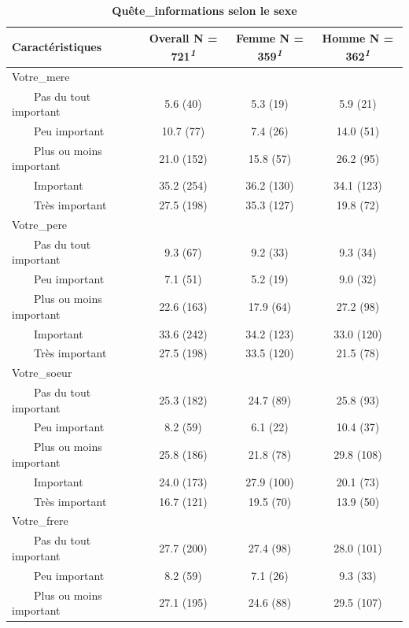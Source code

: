 \documentclass[
]{article}
\begin{document}
\newpage
\begin{table}[!t]
\caption{\label{tab:unnamed-chunk-15}\textbf{Quête\_informations selon le sexe}} 
\fontsize{12.0pt}{14.4pt}\selectfont
\begin{tabular*}{\linewidth}{@{\extracolsep{\fill}}lccc}
\toprule
\textbf{Caractéristiques} & \textbf{Overall}  N = 721\textsuperscript{\textit{1}} & \textbf{Femme}  N = 359\textsuperscript{\textit{1}} & \textbf{Homme}  N = 362\textsuperscript{\textit{1}} \\ 
\midrule\addlinespace[2.5pt]
Votre\_mere &  &  &  \\ 
    Pas du tout important & 5.6 (40) & 5.3 (19) & 5.9 (21) \\ 
    Peu important & 10.7 (77) & 7.4 (26) & 14.0 (51) \\ 
    Plus ou moins important & 21.0 (152) & 15.8 (57) & 26.2 (95) \\ 
    Important & 35.2 (254) & 36.2 (130) & 34.1 (123) \\ 
    Très important & 27.5 (198) & 35.3 (127) & 19.8 (72) \\ 
Votre\_pere &  &  &  \\ 
    Pas du tout important & 9.3 (67) & 9.2 (33) & 9.3 (34) \\ 
    Peu important & 7.1 (51) & 5.2 (19) & 9.0 (32) \\ 
    Plus ou moins important & 22.6 (163) & 17.9 (64) & 27.2 (98) \\ 
    Important & 33.6 (242) & 34.2 (123) & 33.0 (120) \\ 
    Très important & 27.5 (198) & 33.5 (120) & 21.5 (78) \\ 
Votre\_soeur &  &  &  \\ 
    Pas du tout important & 25.3 (182) & 24.7 (89) & 25.8 (93) \\ 
    Peu important & 8.2 (59) & 6.1 (22) & 10.4 (37) \\ 
    Plus ou moins important & 25.8 (186) & 21.8 (78) & 29.8 (108) \\ 
    Important & 24.0 (173) & 27.9 (100) & 20.1 (73) \\ 
    Très important & 16.7 (121) & 19.5 (70) & 13.9 (50) \\ 
Votre\_frere &  &  &  \\ 
    Pas du tout important & 27.7 (200) & 27.4 (98) & 28.0 (101) \\ 
    Peu important & 8.2 (59) & 7.1 (26) & 9.3 (33) \\ 
    Plus ou moins important & 27.1 (195) & 24.6 (88) & 29.5 (107) \\ 

\end{tabular*}
\end{table}
\end{document}
